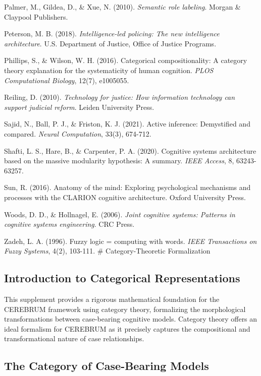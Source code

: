 \documentclass[
  11pt,
  letterpaper,
]{article}
\begin{document}
Palmer, M., Gildea, D., \& Xue, N. (2010). \emph{Semantic role
labeling}. Morgan \& Claypool Publishers.

Peterson, M. B. (2018). \emph{Intelligence-led policing: The new
intelligence architecture}. U.S. Department of Justice, Office of
Justice Programs.

Phillips, S., \& Wilson, W. H. (2016). Categorical compositionality: A
category theory explanation for the systematicity of human cognition.
\emph{PLOS Computational Biology}, 12(7), e1005055.

Reiling, D. (2010). \emph{Technology for justice: How information
technology can support judicial reform}. Leiden University Press.

Sajid, N., Ball, P. J., \& Friston, K. J. (2021). Active inference:
Demystified and compared. \emph{Neural Computation}, 33(3), 674-712.

Shafti, L. S., Hare, B., \& Carpenter, P. A. (2020). Cognitive systems
architecture based on the massive modularity hypothesis: A summary.
\emph{IEEE Access}, 8, 63243-63257.

Sun, R. (2016). Anatomy of the mind: Exploring psychological mechanisms
and processes with the CLARION cognitive architecture. Oxford University
Press.

Woods, D. D., \& Hollnagel, E. (2006). \emph{Joint cognitive systems:
Patterns in cognitive systems engineering}. CRC Press.

Zadeh, L. A. (1996). Fuzzy logic = computing with words. \emph{IEEE
Transactions on Fuzzy Systems}, 4(2), 103-111. \# Category-Theoretic
Formalization

\hypertarget{introduction-to-categorical-representations}{%
\subsection{Introduction to Categorical
Representations}\label{introduction-to-categorical-representations}}

This supplement provides a rigorous mathematical foundation for the
CEREBRUM framework using category theory, formalizing the morphological
transformations between case-bearing cognitive models. Category theory
offers an ideal formalism for CEREBRUM as it precisely captures the
compositional and transformational nature of case relationships.

\hypertarget{the-category-of-case-bearing-models}{%
\subsection{The Category of Case-Bearing
Models}\label{the-category-of-case-bearing-models}}
\end{document}
